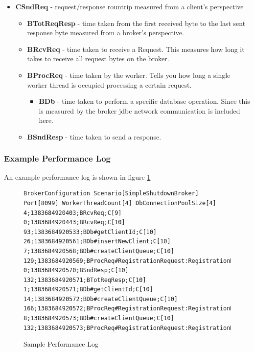 \documentclass[a4paper]{article}
\begin{document}
\begin{itemize}
\item \textbf{CSndReq} - request/response rountrip measured from a client's perspective 
	\begin{itemize}
	\item \textbf{BTotReqResp} - time taken from the first received byte to the last sent response byte measured from a broker's perspective.
	\item \textbf{BRcvReq} - time taken to receive a Request. This measures how long it takes to receive all request bytes on the broker.
	\item \textbf{BProcReq} - time taken by the worker. Tells you how long a single worker thread is occupied processing a certain request.
		\begin{itemize}
   		\item \textbf{BDb} - time taken to perform a specific database operation. Since this is measured by the broker jdbc network communication is included here.
   		\end{itemize}
	\item \textbf{BSndResp} - time taken to send a response.
	\end{itemize}
\end{itemize}

\subsubsection{Example Performance Log}
An example performance log is shown in figure \ref{fig:sample-perf-log}

\begin{figure}[H]
  \begin{center}
	\begin{verbatim}
BrokerConfiguration Scenario[SimpleShutdownBroker] Port[8099] WorkerThreadCount[4] DbConnectionPoolSize[4]
4;1383684920403;BRcvReq;C[9]
0;1383684920443;BRcvReq;C[10]
93;1383684920533;BDb#getClientId;C[10]
26;1383684920561;BDb#insertNewClient;C[10]
7;1383684920568;BDb#createClientQueue;C[10]
129;1383684920569;BProcReq#RegistrationRequest:RegistrationResponse;C[10]
0;1383684920570;BSndResp;C[10]
132;1383684920571;BTotReqResp;C[10]
1;1383684920571;BDb#getClientId;C[10]
14;1383684920572;BDb#createClientQueue;C[10]
166;1383684920572;BProcReq#RegistrationRequest:RegistrationResponse;C[10]
8;1383684920573;BDb#createClientQueue;C[10]
132;1383684920573;BProcReq#RegistrationRequest:RegistrationResponse;C[10]
	\end{verbatim}
  \end{center}
  \caption{Sample Performance Log}
  \label{fig:sample-perf-log}
\end{figure}
\end{document}
